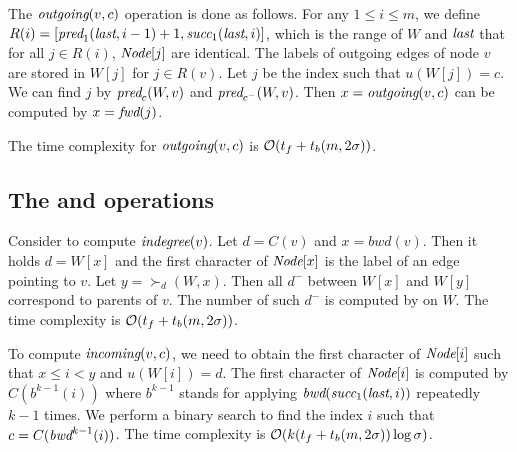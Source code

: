 The ${\textit{outgoing}}(v,c)$ operation is done as follows.
For any $1 \le i \le m$, we define $R(i) = [{\textit{pred}}_1({\textit{last}},i-1)+1,{\textit{succ}}_1({\textit{last}},i)]$,
which is the range of $W$ and ${\textit{last}}$ that for all $j \in R(i)$, ${\textit{Node}}[j]$ are identical.
The labels of outgoing edges of node $v$ are stored in $W[j]$ for $j \in R(v)$.
%
Let $j$ be the index such that $u(W[j]) = c$.
We can find $j$ by ${\textit{pred}}_c(W, v)$ and ${\textit{pred}}_{c^-}(W, v)$.
Then $x = {\textit{outgoing}}(v,c)$ can be computed by $x = \textit{fwd}(j)$.

The time complexity for ${\textit{outgoing}}(v,c)$ is 
$\mathcal{O}(t_f + t_b(m, 2\sigma))$.

\subsection{The {\pdeg} and {\parent} operations}
Consider to compute ${\textit{indegree}}(v)$.
Let $d = C(v)$ and $x = bwd(v)$.  Then it holds $d = W[x]$ and the first character
of ${\textit{Node}}[x]$ is the label of an edge pointing to $v$.
Let $y = {\succ}_d(W, x)$.  Then all $d^-$ between $W[x]$ and $W[y]$ correspond
to parents of $v$.  The number of such $d^-$ is computed by {\rank} on $W$.
The time complexity is $\mathcal{O}(t_f + t_b(m,2\sigma))$.

To compute ${\textit{incoming}}(v,c)$, we need to obtain the first character of ${\textit{Node}}[i]$
such that $x \le i < y$ and $u(W[i]) = d$.  The first character of ${\textit{Node}}[i]$
is computed by $C(b^{k-1}(i))$ where $b^{k-1}$ stands for applying
${\textit{bwd}}({\textit{succ}}_1({\textit{last}},i))$ repeatedly $k-1$ times.  
We perform a binary search to
find the index $i$ such that $c = C({\textit{bwd}}^{k-1}(i))$.
The time complexity is 
$\mathcal{O}(k(t_f + t_b(m,2\sigma))\log\sigma)$.

